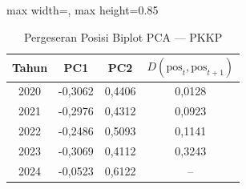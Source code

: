 \begin{table}[H]
\centering
\caption{Pergeseran Posisi Biplot PCA --- PKKP} \label{tab:appjarak_pca_loading_pkkp}
\begin{adjustbox}{max width=\textwidth, max height=0.85\textheight}
\begin{tabular}{|c|c|c|c|}
\hline
\textbf{Tahun} & \textbf{PC1} & \textbf{PC2} & \textbf{$D(\text{pos}_t, \text{pos}_{t+1})$} \\
\hline
2020 & -0,3062 & 0,4406 & 0,0128 \\
2021 & -0,2976 & 0,4312 & 0,0923 \\
2022 & -0,2486 & 0,5093 & 0,1141 \\
2023 & -0,3069 & 0,4112 & 0,3243 \\
2024 & -0,0523 & 0,6122 & -- \\
\hline
\end{tabular}
\end{adjustbox}
\end{table}